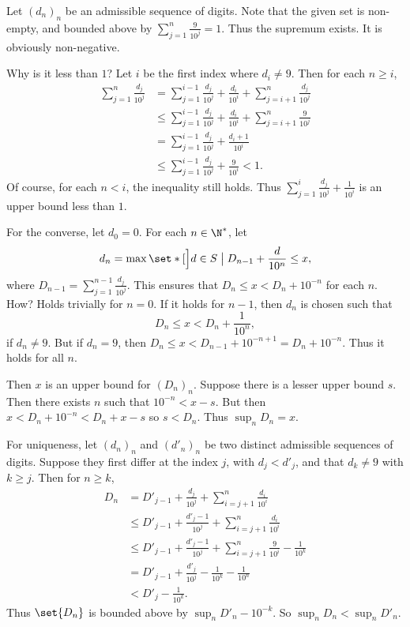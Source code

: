 \documentclass[12pt]{article}
\begin{document}
\begin{solution}
    Let $(d_n)_n$ be an admissible sequence of digits.
    Note that the given set is non-empty, and bounded above by
    $\sum_{j=1}^n \frac{9}{10^j} = 1$.
    Thus the supremum exists.
    It is obviously non-negative.

    Why is it less than $1$?
    Let $i$ be the first index where $d_i \ne 9$.
    Then for each $n \ge i$, \begin{align*}
        \sum_{j=1}^n \frac{d_j}{10^j}
            &= \sum_{j=1}^{i-1} \frac{d_j}{10^j}
                + \frac{d_i}{10^i} + \sum_{j=i+1}^n \frac{d_j}{10^j} \\
            &\le \sum_{j=1}^{i-1} \frac{d_j}{10^j}
                + \frac{d_i}{10^i} + \sum_{j=i+1}^n \frac{9}{10^j} \\
            &= \sum_{j=1}^{i-1} \frac{d_j}{10^j}
                + \frac{d_i + 1}{10^i} \\
            &\le \sum_{j=1}^{i-1} \frac{d_j}{10^j}
                + \frac{9}{10^i} < 1.
    \end{align*} Of course, for each $n < i$, the inequality still holds.
    Thus $\sum_{j=1}^i \frac{d_j}{10^j} + \frac{1}{10^i}$ is an upper bound
    less than $1$.

    For the converse, let $d_0 = 0$.
    For each $n \in \N^*$, let \[
        d_n =
            \max\set*[\Big]{d \in S \bigm| D_{n-1} + \frac{d}{10^n} \le x},
    \] where $D_{n-1} = \sum_{j=1}^{n-1} \frac{d_j}{10^j}$.
    This ensures that $D_n \le x < D_n + 10^{-n}$ for each $n$.
    How? Holds trivially for $n = 0$.
    If it holds for $n-1$, then $d_n$ is chosen such that \[
        D_n \le x < D_n + \frac{1}{10^n},
    \] if $d_n \ne 9$.
    But if $d_n = 9$, then
    $D_n \le x < D_{n-1} + 10^{-n+1} = D_n + 10^{-n}$.
    Thus it holds for all $n$.

    Then $x$ is an upper bound for $(D_n)_n$.
    Suppose there is a lesser upper bound $s$.
    Then there exists $n$ such that $10^{-n} < x - s$.
    But then $x < D_n + 10^{-n} < D_n + x - s$ so $s < D_n$.
    Thus $\sup_n D_n = x$.

    For uniqueness, let $(d_n)_n$ and $(d'_n)_n$ be two distinct admissible
    sequences of digits.
    Suppose they first differ at the index $j$, with $d_j < d'_j$,
    and that $d_k \ne 9$ with $k \ge j$.
    Then for $n \ge k$,
    \begin{align*}
        D_n  &= D'_{j-1} + \frac{d_j}{10^j}
                + \sum_{i=j+1}^n \frac{d_i}{10^i} \\
            &\le D'_{j-1} + \frac{d'_j - 1}{10^j}
                + \sum_{i=j+1}^n \frac{d_i}{10^i} \\
            &\le D'_{j-1} + \frac{d'_j - 1}{10^j}
                + \sum_{i=j+1}^n \frac{9}{10^i} - \frac1{10^k} \\
            &= D'_{j-1} + \frac{d'_j}{10^j} - \frac1{10^k} - \frac1{10^n} \\
            &< D'_j - \frac1{10^k}.
    \end{align*} Thus $\set{D_n}$ is bounded above by
    $\sup_n D'_n - 10^{-k}$.
    So $\sup_n D_n < \sup_n D'_n$.
\end{solution}
\end{document}
